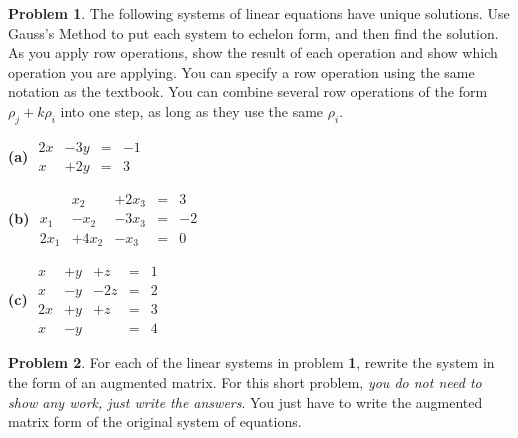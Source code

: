 \documentclass[11pt]{article}
\theoremstyle{definition}
\newtheorem{problem}{Problem}
\newenvironment{answer}{\bgroup\color{blue}}{\egroup}
\begin{document}
\begin{problem}
The following systems of linear equations have unique solutions.  Use 
Gauss's Method to  put each system to echelon form, and then find the solution.
As you apply row operations, show the result of each operation and 
show which operation you are applying.  You can specify
a row operation using the same notation as the textbook.
You can combine several row operations of the form $\rho_j+k\rho_i$ 
into one step, as long as they use the same $\rho_i$.

\bigskip

\textbf{(a)} \qquad
    $\begin{matrix}
       2x & -3y & = & -1 \\
       x  & +2y & = & 3
    \end{matrix}$

\bigskip\bigskip

\textbf{(b)} \qquad
    $\begin{matrix}
           &   x_2 & +2x_3 & = & 3 \\
       x_1 &  -x_2 & -3x_3 & = & -2 \\
      2x_1 & +4x_2 &  -x_3 & = & 0
    \end{matrix}$
    
\bigskip\bigskip
    
\textbf{(c)} \qquad
    $\begin{matrix}
       x &  +y &  +z & = & 1\\
       x &  -y & -2z & = & 2\\
      2x &  +y &  +z & = & 3\\
       x &  -y &     & = & 4
    \end{matrix}$

\end{problem}
\begin{answer}
\end{answer}

\bigskip

\begin{problem}
For each of the linear systems in problem {\bf 1}, rewrite the system in the form
of an augmented matrix.  For this short problem, {\it you do not need to show any work, just
write the answers}.  You just have to write the augmented matrix form of the original
system of equations.
\end{problem}
\begin{answer}
\end{answer}
\end{document}

